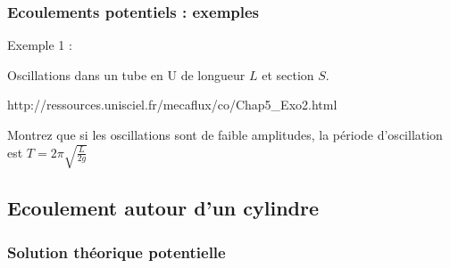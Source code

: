 \subsubsection{Ecoulements potentiels : exemples}


\begin{frame}{Exemple 1 : }

\medskip

Oscillations dans un tube en U de longueur $L$ et section $S$.


\bigskip


http://ressources.unisciel.fr/mecaflux/co/Chap5\_Exo2.html


\bigskip

{\color{vert}{Exercice : }}

Montrez que si les oscillations sont de faible amplitudes, la période d'oscillation est
$T = 2\pi \sqrt{\frac{L}{2g}}$


\vspace{0mm}



\end{frame}





\subsection{Ecoulement autour d'un cylindre}

\subsubsection{Solution théorique potentielle}

